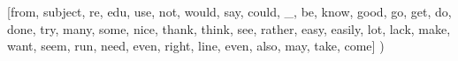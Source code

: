 \documentclass[
  letterpaper,
  DIV=11,
  numbers=noendperiod]{scrreprt}
\newenvironment{Shaded}{\begin{snugshade}}{\end{snugshade}}
\newcommand{\NormalTok}[1]{\textcolor[rgb]{0.00,0.23,0.31}{#1}}
\newcommand{\StringTok}[1]{\textcolor[rgb]{0.13,0.47,0.30}{#1}}
\begin{document}
\begin{Shaded}
\begin{Highlighting}[]
\NormalTok{    [}\StringTok{\textquotesingle{}from\textquotesingle{}}\NormalTok{, }\StringTok{\textquotesingle{}subject\textquotesingle{}}\NormalTok{, }\StringTok{\textquotesingle{}re\textquotesingle{}}\NormalTok{, }\StringTok{\textquotesingle{}edu\textquotesingle{}}\NormalTok{, }\StringTok{\textquotesingle{}use\textquotesingle{}}\NormalTok{, }\StringTok{\textquotesingle{}not\textquotesingle{}}\NormalTok{, }\StringTok{\textquotesingle{}would\textquotesingle{}}\NormalTok{, }\StringTok{\textquotesingle{}say\textquotesingle{}}\NormalTok{, }\StringTok{\textquotesingle{}could\textquotesingle{}}\NormalTok{, }\StringTok{\textquotesingle{}\_\textquotesingle{}}\NormalTok{, }\StringTok{\textquotesingle{}be\textquotesingle{}}\NormalTok{, }\StringTok{\textquotesingle{}know\textquotesingle{}}\NormalTok{, }\StringTok{\textquotesingle{}good\textquotesingle{}}\NormalTok{, }\StringTok{\textquotesingle{}go\textquotesingle{}}\NormalTok{, }\StringTok{\textquotesingle{}get\textquotesingle{}}\NormalTok{, }\StringTok{\textquotesingle{}do\textquotesingle{}}\NormalTok{, }\StringTok{\textquotesingle{}done\textquotesingle{}}\NormalTok{, }\StringTok{\textquotesingle{}try\textquotesingle{}}\NormalTok{, }\StringTok{\textquotesingle{}many\textquotesingle{}}\NormalTok{, }\StringTok{\textquotesingle{}some\textquotesingle{}}\NormalTok{, }\StringTok{\textquotesingle{}nice\textquotesingle{}}\NormalTok{, }\StringTok{\textquotesingle{}thank\textquotesingle{}}\NormalTok{, }\StringTok{\textquotesingle{}think\textquotesingle{}}\NormalTok{, }\StringTok{\textquotesingle{}see\textquotesingle{}}\NormalTok{, }\StringTok{\textquotesingle{}rather\textquotesingle{}}\NormalTok{, }\StringTok{\textquotesingle{}easy\textquotesingle{}}\NormalTok{, }\StringTok{\textquotesingle{}easily\textquotesingle{}}\NormalTok{, }\StringTok{\textquotesingle{}lot\textquotesingle{}}\NormalTok{, }\StringTok{\textquotesingle{}lack\textquotesingle{}}\NormalTok{, }\StringTok{\textquotesingle{}make\textquotesingle{}}\NormalTok{, }\StringTok{\textquotesingle{}want\textquotesingle{}}\NormalTok{, }\StringTok{\textquotesingle{}seem\textquotesingle{}}\NormalTok{, }\StringTok{\textquotesingle{}run\textquotesingle{}}\NormalTok{, }\StringTok{\textquotesingle{}need\textquotesingle{}}\NormalTok{, }\StringTok{\textquotesingle{}even\textquotesingle{}}\NormalTok{, }\StringTok{\textquotesingle{}right\textquotesingle{}}\NormalTok{, }\StringTok{\textquotesingle{}line\textquotesingle{}}\NormalTok{, }\StringTok{\textquotesingle{}even\textquotesingle{}}\NormalTok{, }\StringTok{\textquotesingle{}also\textquotesingle{}}\NormalTok{, }\StringTok{\textquotesingle{}may\textquotesingle{}}\NormalTok{, }\StringTok{\textquotesingle{}take\textquotesingle{}}\NormalTok{, }\StringTok{\textquotesingle{}come\textquotesingle{}}\NormalTok{]}
\NormalTok{    )}


\end{Highlighting}
\end{Shaded}
\end{document}
